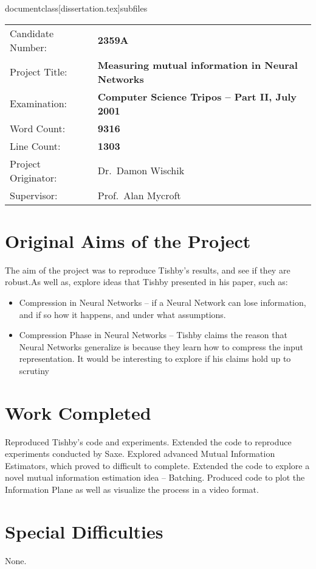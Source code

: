 documentclass[dissertation.tex]{subfiles}


{\large
\begin{tabular}{ll}
Candidate Number:   & \bf 2359A                      \\
Project Title:      & \bf Measuring mutual information in Neural Networks \\
Examination:        & \bf Computer Science Tripos -- Part II, July 2001  \\
Word Count:         & \bf 9316\footnotemark[1] \\
Line Count:         & \bf 1303\footnotemark[2] \\
Project Originator: & Dr.\ Damon Wischik                  \\
Supervisor:         & Prof.\ Alan Mycroft                 \\ 
\end{tabular}
}


\section*{Original Aims of the Project}

The aim of the project was to reproduce Tishby's results, and see if they are
robust.As well as, explore ideas that Tishby presented in his paper, such as: 
\begin{itemize}
  \item{
      Compression in Neural Networks -- if a Neural Network can lose
      information, and if so how it happens, and under what assumptions.
    }
  \item{
      Compression Phase in Neural Networks -- Tishby claims the reason that
      Neural Networks generalize is because they learn how to compress the input
      representation. It would be interesting to explore if his claims hold up
      to scrutiny
    }
\end{itemize}

\section*{Work Completed}

Reproduced Tishby's code and experiments. Extended the code to reproduce
experiments conducted by Saxe. Explored advanced Mutual Information Estimators,
which proved to difficult to complete. Extended the code to explore a novel
mutual information estimation idea -- Batching. Produced code to plot the
Information Plane as well as visualize the process in a video format.

\section*{Special Difficulties}

None.

\newpage


